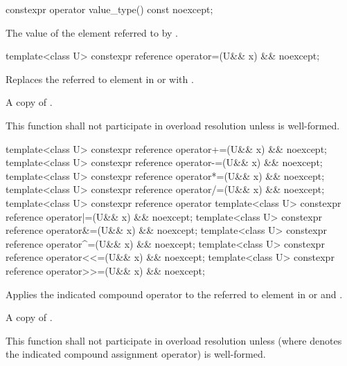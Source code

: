 \begin{itemdecl}
constexpr operator value_type() const noexcept;
\end{itemdecl}

\begin{itemdescr}
  \pnum\returns
  The value of the element referred to by .
\end{itemdescr}

\begin{itemdecl}
template<class U> constexpr reference operator=(U&& x) && noexcept;
\end{itemdecl}

\begin{itemdescr}
  \pnum\effects
  Replaces the referred to element in  or  with .

  \pnum\returns
  A copy of .

  \pnum\remarks
  This function shall not participate in overload resolution unless  is well-formed.
\end{itemdescr}

\begin{itemdecl}
template<class U> constexpr reference operator+=(U&& x) && noexcept;
template<class U> constexpr reference operator-=(U&& x) && noexcept;
template<class U> constexpr reference operator*=(U&& x) && noexcept;
template<class U> constexpr reference operator/=(U&& x) && noexcept;
template<class U> constexpr reference operator%
template<class U> constexpr reference operator|=(U&& x) && noexcept;
template<class U> constexpr reference operator&=(U&& x) && noexcept;
template<class U> constexpr reference operator^=(U&& x) && noexcept;
template<class U> constexpr reference operator<<=(U&& x) && noexcept;
template<class U> constexpr reference operator>>=(U&& x) && noexcept;
\end{itemdecl}

\begin{itemdescr}
  \pnum\effects
  Applies the indicated compound operator to the referred to element in  or  and .

  \pnum\returns
  A copy of .

  \pnum\remarks
  This function shall not participate in overload resolution unless  (where  denotes the indicated compound assignment operator) is well-formed.
\end{itemdescr}

